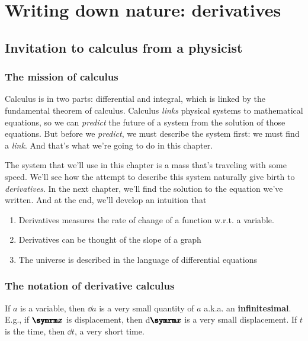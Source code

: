 \chapter{Writing down nature: derivatives}
\label{sec:derivatives}


\section{Invitation to calculus from a physicist}


\subsection{The mission of calculus}

Calculus is in two parts: differential and integral, which is linked by the fundamental theorem of calculus. Calculus \emph{links} physical systems to mathematical equations, so we can \emph{predict} the future of a system from the solution of those equations. But before we \emph{predict}, we must describe the system first: we must find a \emph{link}. And that's what we're going to do in this chapter.

The system that we'll use in this chapter is a mass that's traveling with some speed. We'll see how the attempt to describe this system naturally give birth to \emph{derivatives}. In the next chapter, we'll find the solution to the equation we've written. And at the end, we'll develop an intuition that
\begin{enumerate}[noitemsep]
    \item Derivatives measures the rate of change of a function w.r.t. a variable.
    \item Derivatives can be thought of the slope of a graph
    \item The universe is described in the language of differential equations
\end{enumerate}

\subsection{The notation of derivative calculus}
\label{sec:notation_of_calculus_derivative}

If $a$ is a variable, then $\dd{a}$ is a very small quantity of $a$ a.k.a. an \textbf{infinitesimal}. E.g., if $\vv{x}$ is displacement, then $\dd{\vv{x}}$ is a very small displacement. If $t$ is the time, then $\dd{t}$, a very short time.

